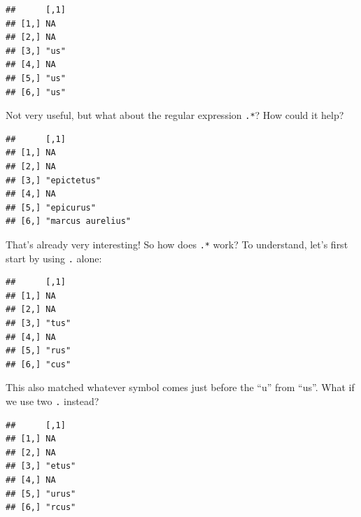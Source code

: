 \documentclass[]{gitbook}
\newenvironment{Shaded}{\begin{snugshade}}{\end{snugshade}}
\newcommand{\KeywordTok}[1]{\textcolor[rgb]{0.13,0.29,0.53}{\textbf{#1}}}
\newcommand{\NormalTok}[1]{#1}
\newcommand{\OperatorTok}[1]{\textcolor[rgb]{0.81,0.36,0.00}{\textbf{#1}}}
\newcommand{\StringTok}[1]{\textcolor[rgb]{0.31,0.60,0.02}{#1}}
\begin{document}
\begin{verbatim}
##      [,1]
## [1,] NA  
## [2,] NA  
## [3,] "us"
## [4,] NA  
## [5,] "us"
## [6,] "us"
\end{verbatim}

Not very useful, but what about the regular expression \texttt{.*}? How could it help?

\begin{Shaded}
\end{Shaded}

\begin{verbatim}
##      [,1]             
## [1,] NA               
## [2,] NA               
## [3,] "epictetus"      
## [4,] NA               
## [5,] "epicurus"       
## [6,] "marcus aurelius"
\end{verbatim}

That's already very interesting! So how does \texttt{.*} work? To understand, let's first start by using
\texttt{.} alone:

\begin{Shaded}
\end{Shaded}

\begin{verbatim}
##      [,1] 
## [1,] NA   
## [2,] NA   
## [3,] "tus"
## [4,] NA   
## [5,] "rus"
## [6,] "cus"
\end{verbatim}

This also matched whatever symbol comes just before the ``u'' from ``us''. What if we use two \texttt{.} instead?

\begin{Shaded}
\end{Shaded}

\begin{verbatim}
##      [,1]  
## [1,] NA    
## [2,] NA    
## [3,] "etus"
## [4,] NA    
## [5,] "urus"
## [6,] "rcus"
\end{verbatim}
\end{document}
